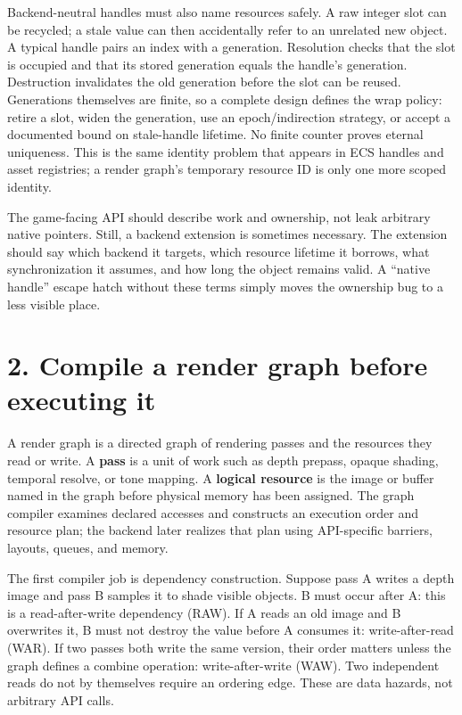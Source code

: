 Backend-neutral handles must also name resources safely. A raw integer slot can be recycled; a stale value can then accidentally refer to an unrelated new object. A typical handle pairs an index with a generation. Resolution checks that the slot is occupied and that its stored generation equals the handle's generation. Destruction invalidates the old generation before the slot can be reused. Generations themselves are finite, so a complete design defines the wrap policy: retire a slot, widen the generation, use an epoch/indirection strategy, or accept a documented bound on stale-handle lifetime. No finite counter proves eternal uniqueness. This is the same identity problem that appears in ECS handles and asset registries; a render graph's temporary resource ID is only one more scoped identity.

The game-facing API should describe work and ownership, not leak arbitrary native pointers. Still, a backend extension is sometimes necessary. The extension should say which backend it targets, which resource lifetime it borrows, what synchronization it assumes, and how long the object remains valid. A ``native handle'' escape hatch without these terms simply moves the ownership bug to a less visible place.

\section{2. Compile a render graph before executing it}\label{06-engine-ii-ch042-compile-a-render-graph-before-executing-it}

A render graph is a directed graph of rendering passes and the resources they read or write. A \textbf{pass} is a unit of work such as depth prepass, opaque shading, temporal resolve, or tone mapping. A \textbf{logical resource} is the image or buffer named in the graph before physical memory has been assigned. The graph compiler examines declared accesses and constructs an execution order and resource plan; the backend later realizes that plan using API-specific barriers, layouts, queues, and memory.

The first compiler job is dependency construction. Suppose pass A writes a depth image and pass B samples it to shade visible objects. B must occur after A: this is a read-after-write dependency (RAW). If A reads an old image and B overwrites it, B must not destroy the value before A consumes it: write-after-read (WAR). If two passes both write the same version, their order matters unless the graph defines a combine operation: write-after-write (WAW). Two independent reads do not by themselves require an ordering edge. These are data hazards, not arbitrary API calls.


